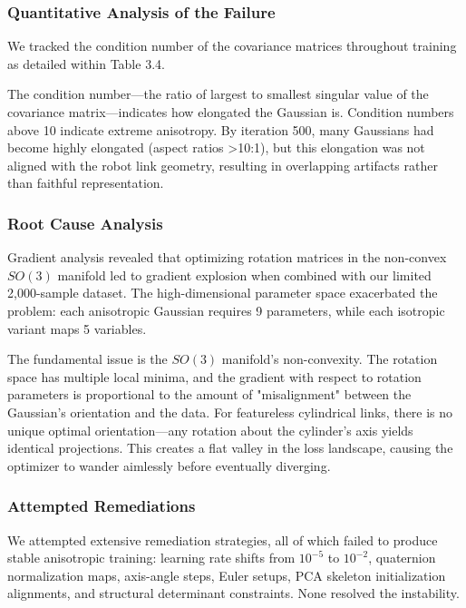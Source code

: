 \documentclass[12pt,a4paper,oneside]{report}
\begin{document}
\subsubsection{Quantitative Analysis of the Failure}

We tracked the condition number of the covariance matrices throughout training as detailed within Table 3.4.

The condition number---the ratio of largest to smallest singular value of the covariance matrix---indicates how elongated the Gaussian is. Condition numbers above 10 indicate extreme anisotropy. By iteration 500, many Gaussians had become highly elongated (aspect ratios >10:1), but this elongation was not aligned with the robot link geometry, resulting in overlapping artifacts rather than faithful representation.

\subsubsection{Root Cause Analysis}

Gradient analysis revealed that optimizing rotation matrices in the non-convex $SO(3)$ manifold led to gradient explosion when combined with our limited 2,000-sample dataset. The high-dimensional parameter space exacerbated the problem: each anisotropic Gaussian requires 9 parameters, while each isotropic variant maps 5 variables.

The fundamental issue is the $SO(3)$ manifold's non-convexity. The rotation space has multiple local minima, and the gradient with respect to rotation parameters is proportional to the amount of "misalignment" between the Gaussian's orientation and the data. For featureless cylindrical links, there is no unique optimal orientation---any rotation about the cylinder's axis yields identical projections. This creates a flat valley in the loss landscape, causing the optimizer to wander aimlessly before eventually diverging.

\subsubsection{Attempted Remediations}

We attempted extensive remediation strategies, all of which failed to produce stable anisotropic training: learning rate shifts from $10^{-5}$ to $10^{-2}$, quaternion normalization maps, axis-angle steps, Euler setups, PCA skeleton initialization alignments, and structural determinant constraints. None resolved the instability.
\end{document}
